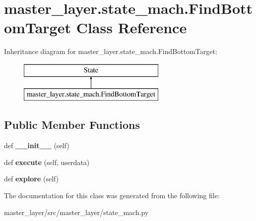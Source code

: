 \hypertarget{classmaster__layer_1_1state__mach_1_1FindBottomTarget}{}\section{master\+\_\+layer.\+state\+\_\+mach.\+Find\+Bottom\+Target Class Reference}
\label{classmaster__layer_1_1state__mach_1_1FindBottomTarget}
Inheritance diagram for master\+\_\+layer.\+state\+\_\+mach.\+Find\+Bottom\+Target\+:\begin{figure}[H]
\begin{center}
\leavevmode
\includegraphics[height=2.000000cm]{classmaster__layer_1_1state__mach_1_1FindBottomTarget}
\end{center}
\end{figure}
\subsection*{Public Member Functions}
\begin{DoxyCompactItemize}
\item 
\mbox{\label{classmaster__layer_1_1state__mach_1_1FindBottomTarget_affe3849f49224418c92b861a1f8caf5d}} 
def {\bfseries \+\_\+\+\_\+init\+\_\+\+\_\+} (self)
\item 
\mbox{\label{classmaster__layer_1_1state__mach_1_1FindBottomTarget_a7d98a6e5387914c6f52bdd19e3957225}} 
def {\bfseries execute} (self, userdata)
\item 
\mbox{\label{classmaster__layer_1_1state__mach_1_1FindBottomTarget_a80a644d8358eb0732241072b3ad50f45}} 
def {\bfseries explore} (self)
\end{DoxyCompactItemize}


The documentation for this class was generated from the following file\+:\begin{DoxyCompactItemize}
\item 
master\+\_\+layer/src/master\+\_\+layer/state\+\_\+mach.\+py\end{DoxyCompactItemize}
